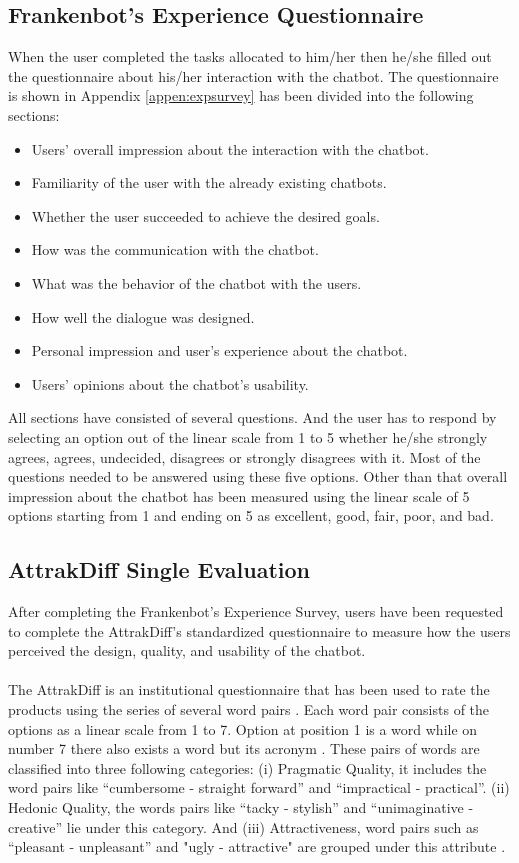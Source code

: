 \subsection{Frankenbot's Experience Questionnaire}
When the user completed the tasks allocated to him/her then he/she filled out the questionnaire about his/her interaction with the chatbot. The questionnaire is shown in Appendix \ref{appen:expsurvey} has been divided into the following sections:
\begin{itemize}
    \item Users' overall impression about the interaction with the chatbot.
    \item Familiarity of the user with the already existing chatbots.
    \item Whether the user succeeded to achieve the desired goals.
    \item How was the communication with the chatbot.
    \item What was the behavior of the chatbot with the users.
    \item How well the dialogue was designed.
    \item Personal impression and user's experience about the chatbot.
    \item Users' opinions about the chatbot's usability. 
\end{itemize} 
All sections have consisted of several questions. And the user has to respond by selecting an option out of the linear scale from 1 to 5 whether he/she strongly agrees, agrees, undecided, disagrees or strongly disagrees with it. Most of the questions needed to be answered using these five options. Other than that overall impression about the chatbot has been measured using the linear scale of 5 options starting from 1 and ending on 5 as excellent, good, fair, poor, and bad.

\subsection{AttrakDiff Single Evaluation}
After completing the Frankenbot's Experience Survey, users have been requested to complete the AttrakDiff's standardized questionnaire to measure how the users perceived the design, quality, and usability of the chatbot.
\\~\\
The AttrakDiff is an institutional questionnaire that has been used to rate the products using the series of several word pairs \cite{alex}. Each word pair consists of the options as a linear scale from 1 to 7. Option at position 1 is a word while on number 7 there also exists a word but its acronym \cite{attrakdiffQuest}. These pairs of words are classified into three following categories: (i) Pragmatic Quality, it includes the word pairs like “cumbersome - straight forward” and “impractical - practical”. (ii) Hedonic Quality, the words pairs like “tacky - stylish” and “unimaginative - creative” lie under this category. And (iii) Attractiveness, word pairs such as “pleasant - unpleasant” and "ugly - attractive" are grouped under this attribute \cite{alex}.

